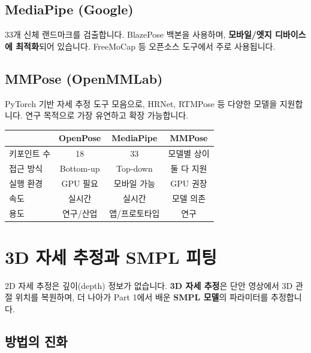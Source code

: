 \documentclass[11pt, a4paper]{report}
\begin{document}
\subsection{MediaPipe (Google)}

33개 신체 랜드마크를 검출합니다. BlazePose 백본을 사용하며, \textbf{모바일/엣지 디바이스에 최적화}되어 있습니다. FreeMoCap 등 오픈소스 도구에서 주로 사용됩니다.

\subsection{MMPose (OpenMMLab)}

PyTorch 기반 자세 추정 도구 모음으로, HRNet, RTMPose 등 다양한 모델을 지원합니다. 연구 목적으로 가장 유연하고 확장 가능합니다.

\begin{center}
\renewcommand{\arraystretch}{1.3}
\small
\begin{tabular}{lccc}
\toprule
& \textbf{OpenPose} & \textbf{MediaPipe} & \textbf{MMPose} \\
\midrule
키포인트 수 & 18 & 33 & 모델별 상이 \\
접근 방식 & Bottom-up & Top-down & 둘 다 지원 \\
실행 환경 & GPU 필요 & 모바일 가능 & GPU 권장 \\
속도 & 실시간 & 실시간 & 모델 의존 \\
용도 & 연구/산업 & 앱/프로토타입 & 연구 \\
\bottomrule
\end{tabular}
\end{center}


\section{3D 자세 추정과 SMPL 피팅}
\label{sec:smpl_fitting}

2D 자세 추정은 깊이(depth) 정보가 없습니다. \textbf{3D 자세 추정}은 단안 영상에서 3D 관절 위치를 복원하며, 더 나아가 Part 1에서 배운 \textbf{SMPL 모델}의 파라미터를 추정합니다.

\subsection{방법의 진화}
\end{document}
